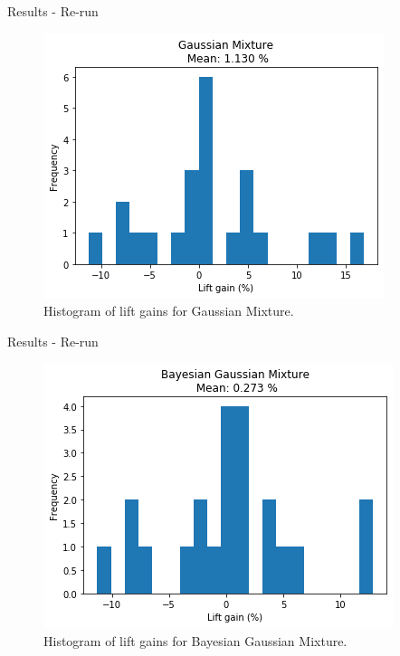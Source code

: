 
\begin{frame}{Results - Re-run \fullNameExperimentII{}}
    \begin{figure}
        \centering
        \includegraphics[width=.75\linewidth]{fig/ch4-gmm_lift_gain_hist.png}
        \caption{Histogram of lift gains for Gaussian Mixture.}
    \end{figure}
\end{frame}


\begin{frame}{Results - Re-run \fullNameExperimentII{}}
    \begin{figure}
        \centering
        \includegraphics[width=.75\linewidth]{fig/ch4-bgm_lift_gain_hist.png}
        \caption{Histogram of lift gains for Bayesian Gaussian Mixture.}
    \end{figure}
\end{frame}